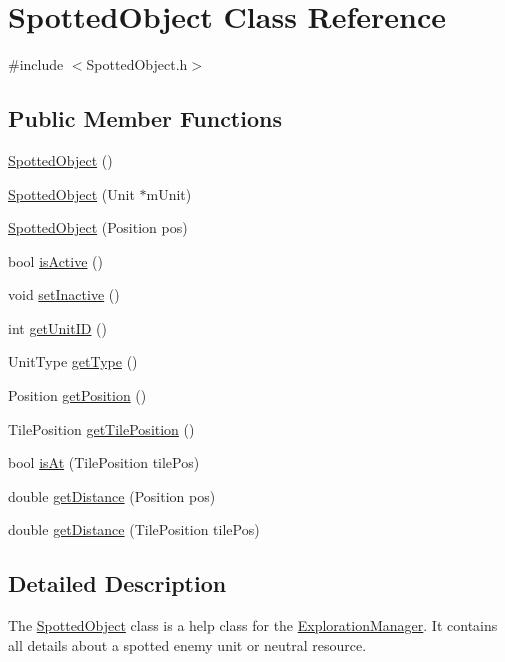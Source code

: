\hypertarget{class_spotted_object}{\section{Spotted\-Object Class Reference}
\label{class_spotted_object}
}


{\ttfamily \#include $<$Spotted\-Object.\-h$>$}

\subsection*{Public Member Functions}
\begin{DoxyCompactItemize}
\item 
\hyperlink{class_spotted_object_affa58c78f3d254f531cd7999d2daf14c}{Spotted\-Object} ()
\item 
\hyperlink{class_spotted_object_abf539a72d6dce44be722ddb142be3621}{Spotted\-Object} (Unit $\ast$m\-Unit)
\item 
\hyperlink{class_spotted_object_a6737acdf0e9cd0f7d803819ce068d204}{Spotted\-Object} (Position pos)
\item 
bool \hyperlink{class_spotted_object_a02e802842a5e59eb417e0f1d93ba7690}{is\-Active} ()
\item 
void \hyperlink{class_spotted_object_ae350108ccccc3683df77a5e41f827f36}{set\-Inactive} ()
\item 
int \hyperlink{class_spotted_object_a2fb37dace2377f0ebf5de3266d018749}{get\-Unit\-I\-D} ()
\item 
Unit\-Type \hyperlink{class_spotted_object_ad140f234166a2987e31f263aad86b0aa}{get\-Type} ()
\item 
Position \hyperlink{class_spotted_object_acf6be68073a692d2f13db3feeedf6030}{get\-Position} ()
\item 
Tile\-Position \hyperlink{class_spotted_object_a2f4fcb5523e5de5cb75050208060bcf5}{get\-Tile\-Position} ()
\item 
bool \hyperlink{class_spotted_object_ade1653e383d666ca7dd3788856973b74}{is\-At} (Tile\-Position tile\-Pos)
\item 
double \hyperlink{class_spotted_object_ae62491ae89e336c1981ad88269423bdd}{get\-Distance} (Position pos)
\item 
double \hyperlink{class_spotted_object_a25d127bbde29d141d831562348a05b39}{get\-Distance} (Tile\-Position tile\-Pos)
\end{DoxyCompactItemize}


\subsection{Detailed Description}
The \hyperlink{class_spotted_object}{Spotted\-Object} class is a help class for the \hyperlink{class_exploration_manager}{Exploration\-Manager}. It contains all details about a spotted enemy unit or neutral resource.

